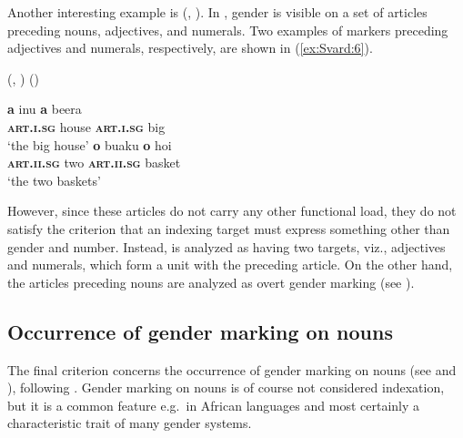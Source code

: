 \documentclass[output=collectionpaper]{langsci/langscibook}
\begin{document}
%

Another interesting example is  (, ). In , gender is visible on a set of articles preceding nouns, adjectives, and numerals. Two examples of markers preceding adjectives and numerals, respectively, are shown in (\ref{ex:Svard:6}).

\ea
\label{ex:Svard:6}
 (, ) (\citealt[330, 328]{Mosel2000})\\
\begin{xlist}
\ex
\gll \textbf{a} inu \textbf{a} beera\\
     \textsc{\textbf{art.i.sg}} house \textsc{\textbf{art.i.sg}} big\\
\glt `the big house'
\ex
\gll \textbf{o} buaku \textbf{o} hoi\\
     \textsc{\textbf{art.ii.sg}} two \textsc{\textbf{art.ii.sg}} basket\\
\glt `the two baskets'
\end{xlist}
\z

However, since these articles do not carry any other functional load, they do not satisfy the criterion that an indexing target must express something other than gender and number. Instead,  is analyzed as having two targets, viz., adjectives and numerals, which form a unit with the preceding article. On the other hand, the articles preceding nouns are analyzed as overt gender marking (see ).

\subsection{Occurrence of gender marking on nouns}
\label{sec:Svard:3.5}

The final criterion concerns the occurrence of gender marking on nouns (see  and ), following \citet[69]{DiGarbo2014}. Gender marking on nouns is of course not considered indexation, but it is a common feature e.g.\ in African languages and most certainly a characteristic trait of many gender systems.
\end{document}
